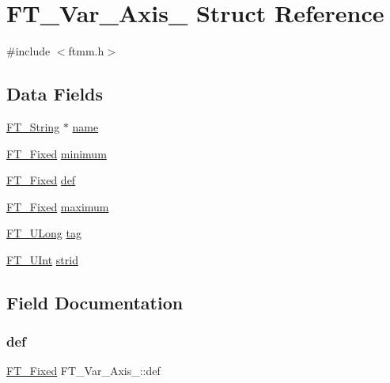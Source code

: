 \hypertarget{struct_f_t___var___axis__}{}\section{F\+T\+\_\+\+Var\+\_\+\+Axis\+\_\+ Struct Reference}
\label{struct_f_t___var___axis__}


{\ttfamily \#include $<$ftmm.\+h$>$}

\subsection*{Data Fields}
\begin{DoxyCompactItemize}
\item 
\hyperlink{fttypes_8h_a9846214585359eb2ba6bbb0e6de30639}{F\+T\+\_\+\+String} $\ast$ \hyperlink{struct_f_t___var___axis___a8d0e0af322a692999ec3733a3e18a5a4}{name}
\item 
\hyperlink{fttypes_8h_a5f5a679cc09f758efdd0d1c5feed3c3d}{F\+T\+\_\+\+Fixed} \hyperlink{struct_f_t___var___axis___aae13a8dea1c96bc3949019e8117e7edb}{minimum}
\item 
\hyperlink{fttypes_8h_a5f5a679cc09f758efdd0d1c5feed3c3d}{F\+T\+\_\+\+Fixed} \hyperlink{struct_f_t___var___axis___a37a6ca4188a6bfd95d9d06538bf1a3dd}{def}
\item 
\hyperlink{fttypes_8h_a5f5a679cc09f758efdd0d1c5feed3c3d}{F\+T\+\_\+\+Fixed} \hyperlink{struct_f_t___var___axis___a5704641439e9f318cf3c2b73864e3260}{maximum}
\item 
\hyperlink{fttypes_8h_a4fac88bdba78eb76b505efa6e4fbf3f5}{F\+T\+\_\+\+U\+Long} \hyperlink{struct_f_t___var___axis___a01ef9396e34e740c2d2b8c7117094624}{tag}
\item 
\hyperlink{fttypes_8h_abcb8db4dbf35d2b55a9e8c7b0926dc52}{F\+T\+\_\+\+U\+Int} \hyperlink{struct_f_t___var___axis___a297d28ab0f5666e56d7575249ccc75d7}{strid}
\end{DoxyCompactItemize}


\subsection{Field Documentation}
\mbox{\label{struct_f_t___var___axis___a37a6ca4188a6bfd95d9d06538bf1a3dd}} 
\subsubsection{\texorpdfstring{def}{def}}
{\footnotesize\ttfamily \hyperlink{fttypes_8h_a5f5a679cc09f758efdd0d1c5feed3c3d}{F\+T\+\_\+\+Fixed} F\+T\+\_\+\+Var\+\_\+\+Axis\+\_\+\+::def}

